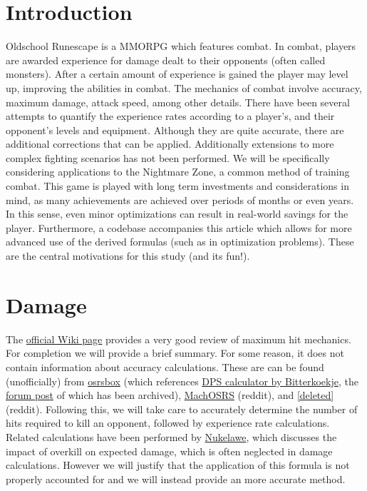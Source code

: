\documentclass[../../main.tex]{subfiles}
\begin{document}
	\tableofcontents
	\newpage
	\section{Introduction}
		Oldschool Runescape is a MMORPG which features combat. In combat, players are awarded experience for damage dealt to their opponents (often called monsters). After a certain amount of experience is gained the player may level up, improving the abilities in combat. The mechanics of combat involve accuracy, maximum damage, attack speed, among other details. There have been several attempts to quantify the experience rates according to a player's, and their opponent's levels and equipment. Although they are quite accurate, there are additional corrections that can be applied. Additionally extensions to more complex fighting scenarios has not been performed. We will be specifically considering applications to the Nightmare Zone, a common method of training combat. This game is played with long term investments and considerations in mind, as many achievements are achieved over periods of months or even years. In this sense, even minor optimizations can result in real-world savings for the player. Furthermore, a codebase accompanies this article which allows for more advanced use of the derived formulas (such as in optimization problems). These are the central motivations for this study (and its fun!).

	\section{Damage}
		The \href{https://oldschool.runescape.wiki/w/Maximum_hit}{official Wiki page} provides a very good review of maximum hit mechanics. For completion we will provide a brief summary. For some reason, it does not contain information about accuracy calculations. These are can be found (unofficially) from \href{https://www.osrsbox.com/blog/2019/01/22/calculating-melee-dps-in-osrs/}{osrsbox} (which references \href{https://docs.google.com/spreadsheets/d/1wzy1VxNWEAAc0FQyDAdpiFggAfn5U6RGPp2CisAHZW8/edit#gid=158500257}{DPS calculator by Bitterkoekje}, the \href{https://web.archive.org/web/20190905124128/http://webcache.googleusercontent.com/search?q=cache:http://services.runescape.com/m=forum/forums.ws?317,318,712,65587452}{forum post} of which has been archived), \href{https://www.reddit.com/r/2007scape/comments/40bvk6/accuracy_and_exphr_combat_formula/}{MachOSRS} (reddit), and \href{https://www.reddit.com/r/2007scape/comments/5lrty0/math_inside_corrected_accuracy_formula/}{[deleted]} (reddit).  Following this, we will take care to accurately determine the number of hits required to kill an opponent, followed by experience rate calculations. Related calculations have been performed by \href{https://www.reddit.com/r/2007scape/comments/4d6l7j/effects_of_overkill_on_dps/}{Nukelawe}, which discusses the impact of overkill on expected damage, which is often neglected in damage calculations. However we will justify that the application of this formula is not properly accounted for and we will instead provide an more accurate method.
\end{document}
